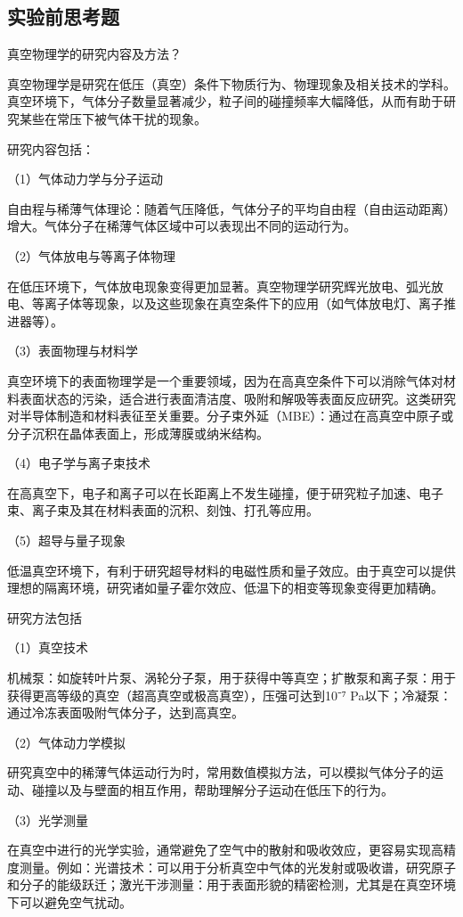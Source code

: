 \documentclass[dvipsnames, svgnames,a4paper,11pt]{article}
\begin{document}
\clearpage
\subsection{实验前思考题}
\begin{question}
	真空物理学的研究内容及方法？
\end{question}
真空物理学是研究在低压（真空）条件下物质行为、物理现象及相关技术的学科。真空环境下，气体分子数量显著减少，粒子间的碰撞频率大幅降低，从而有助于研究某些在常压下被气体干扰的现象。

研究内容包括：

（1）气体动力学与分子运动

自由程与稀薄气体理论：随着气压降低，气体分子的平均自由程（自由运动距离）增大。气体分子在稀薄气体区域中可以表现出不同的运动行为。

（2）气体放电与等离子体物理

在低压环境下，气体放电现象变得更加显著。真空物理学研究辉光放电、弧光放电、等离子体等现象，以及这些现象在真空条件下的应用（如气体放电灯、离子推进器等）。

（3）表面物理与材料学

真空环境下的表面物理学是一个重要领域，因为在高真空条件下可以消除气体对材料表面状态的污染，适合进行表面清洁度、吸附和解吸等表面反应研究。这类研究对半导体制造和材料表征至关重要。分子束外延（MBE）：通过在高真空中原子或分子沉积在晶体表面上，形成薄膜或纳米结构。

（4）电子学与离子束技术

在高真空下，电子和离子可以在长距离上不发生碰撞，便于研究粒子加速、电子束、离子束及其在材料表面的沉积、刻蚀、打孔等应用。

 （5）超导与量子现象

低温真空环境下，有利于研究超导材料的电磁性质和量子效应。由于真空可以提供理想的隔离环境，研究诸如量子霍尔效应、低温下的相变等现象变得更加精确。

研究方法包括

（1）真空技术

机械泵：如旋转叶片泵、涡轮分子泵，用于获得中等真空；扩散泵和离子泵：用于获得更高等级的真空（超高真空或极高真空），压强可达到10⁻⁷ Pa以下；冷凝泵：通过冷冻表面吸附气体分子，达到高真空。

（2）气体动力学模拟

研究真空中的稀薄气体运动行为时，常用数值模拟方法，可以模拟气体分子的运动、碰撞以及与壁面的相互作用，帮助理解分子运动在低压下的行为。

（3）光学测量

在真空中进行的光学实验，通常避免了空气中的散射和吸收效应，更容易实现高精度测量。例如：光谱技术：可以用于分析真空中气体的光发射或吸收谱，研究原子和分子的能级跃迁；激光干涉测量：用于表面形貌的精密检测，尤其是在真空环境下可以避免空气扰动。
\end{document}
